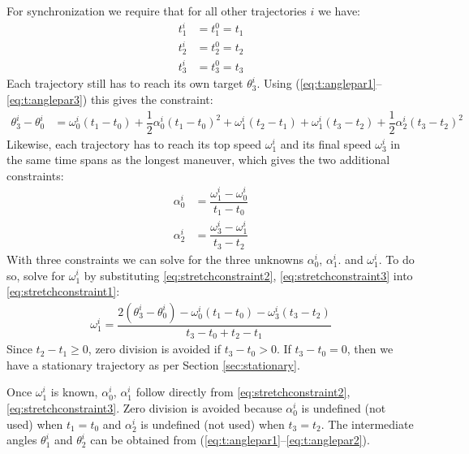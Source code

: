 \documentclass[12pt, a4paper]
{article}
\providecommand{\lr}[1]{\left(#1\right)}
\providecommand{\w}{\omega}
\renewcommand{\th}{\theta}
\renewcommand{\a}{\alpha}
\begin{document}
For synchronization we require that for all other trajectories $i$ we have:
%
\begin{align}
    t^i_1 &= t^0_1=t_1\\[1em]
    t^i_2 &= t^0_2=t_2\\[1em]
    t^i_3 &= t^0_3=t_3
\end{align}
%
Each trajectory still has to reach its own target $\th^i_3$.
Using (\ref{eq:t:anglepar1}--\ref{eq:t:anglepar3}) this gives the constraint:
%
\begin{align}
    \label{eq:stretchconstraint1}
    \th^i_3 - \th^i_0  &=  \w^i_0(t_1-t_0)+\dfrac{1}{2}\a^i_0(t_1-t_0)^2+
        \w^i_1(t_2-t_1)+ \w^i_1(t_3-t_2)+\dfrac{1}{2}\a^i_2(t_3-t_2)^2    
\end{align}
%
Likewise, each trajectory has to reach its top speed $\w^i_1$ and its final
speed $\w^i_3$ in the same time spans as the longest maneuver, which gives the
two additional constraints:
%
\begin{align}
    \label{eq:stretchconstraint2}
    \a^i_0 &= \dfrac{\w^i_1-\w_0^i}{t_1 - t_0}\\[1em]
    \label{eq:stretchconstraint3}
    \a_2^i &= \dfrac{\w_3^i-\w_1^i}{t_3 - t_2}
\end{align}
%
With three constraints we can solve for the three unknowns $\a^i_0$, $\a^i_1$.
and $\w^i_1$. To do so, solve for $\w^i_1$ by substituting
\eqref{eq:stretchconstraint2}, \eqref{eq:stretchconstraint3} into
\eqref{eq:stretchconstraint1}:
%
\begin{align}
    \label{eq:stretchconstraintsolved}
    \w^i_1 = \dfrac{2\lr{\th_3^i-\th_0^i}-\w_0^i\lr{t_1-t_0} -
    \w_3^i\lr{t_3-t_2}}{t_3-t_0 + t_2 - t_1}
\end{align}
%
Since $t_2 - t_1 \geq 0$, zero division is avoided if $t_3 - t_0 > 0$. If $t_3
- t_0 = 0$, then we have a stationary trajectory as per Section
\ref{sec:stationary}.

Once $\w^i_1$ is known, $\a^i_0$, $\a^i_1$ follow directly from
\eqref{eq:stretchconstraint2}, \eqref{eq:stretchconstraint3}. Zero division is
avoided because $\a^i_0$ is undefined (not used) when $t_1 = t_0$ and $\a^i_2$
is undefined (not used) when $t_3 = t_2$. The intermediate angles $\th_1^i$
and $\th_2^i$ can be obtained from
(\ref{eq:t:anglepar1}--\ref{eq:t:anglepar2}).
\end{document}
